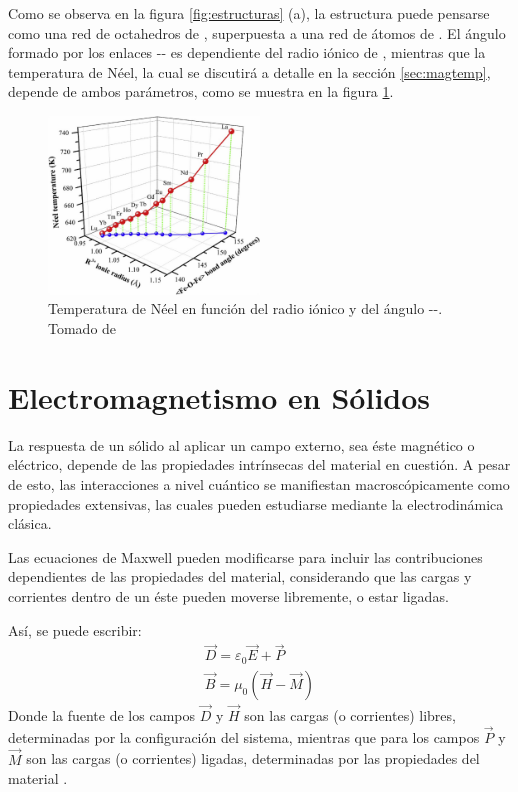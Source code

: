 \documentclass[../main.tex]{subfiles}
\begin{document}
Como se observa en la figura \ref{fig:estructuras} (a), la estructura puede pensarse como una red de octahedros de , superpuesta a una red de átomos de . El ángulo formado por los enlaces -- es dependiente del radio iónico de , mientras que la temperatura de Néel, la cual se discutirá a detalle en la sección \ref{sec:magtemp}, depende de ambos parámetros, como se muestra en la figura \ref{fig:neelradio}.

\begin{figure}[H]
    \centering
    \includegraphics[width=0.5\textwidth]{fig/neelradio.jpg}
    \caption{Temperatura de Néel en función del radio iónico y del ángulo --. Tomado de \cite{Wang2019}}
    \label{fig:neelradio}
\end{figure}

\section{Electromagnetismo en Sólidos}
La respuesta de un sólido al aplicar un campo externo, sea éste magnético o eléctrico, depende de las propiedades intrínsecas del material en cuestión. A pesar de esto, las interacciones a nivel cuántico se manifiestan macroscópicamente como propiedades extensivas, las cuales pueden estudiarse mediante la electrodinámica clásica.

Las ecuaciones de Maxwell pueden modificarse para incluir las contribuciones dependientes de las propiedades del material, considerando que las cargas y corrientes dentro de un éste pueden moverse libremente, o estar ligadas.

Así, se puede escribir:
\begin{equation}
    \begin{split}
        \vec{D}=\varepsilon_0\vec{E}+\vec{P}\\
        \vec{B}=\mu_0(\vec{H}-\vec{M})
    \end{split}  
    \label{eq:maxwellmacro}
\end{equation}
Donde la fuente de los campos $\vec{D}$ y $\vec{H}$ son las cargas (o corrientes) libres, determinadas por la configuración del sistema, mientras que para los campos $\vec{P}$ y $\vec{M}$ son las cargas (o corrientes) ligadas, determinadas por las propiedades del material \cite{griffiths2023introduction}.
\end{document}
